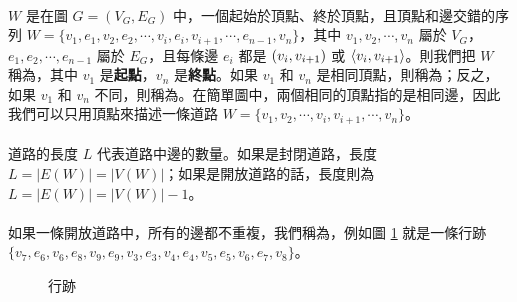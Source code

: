 \documentclass[12pt,a4paper,oneside]{report}
\begin{document}
\begin{CJK}{UTF8}{bkai}
\paragraph{}$W$ 是在圖 $G=(V_G,E_G)$ 中，一個起始於頂點、終於頂點，且頂點和邊交錯的序列 $W=\{{v_1,e_1,v_2,e_2,\cdots{}, v_i,e_i,v_{i+1},\cdots{},e_{n-1},v_n}\}$，其中 $v_1,v_2,\cdots{},v_n$ 屬於 $V_G$，$e_1,e_2,\cdots{},e_{n-1}$ 屬於 $E_G$，且每條邊 $e_i$ 都是 $({v_i},{v_{i+1}})$ 或 $\langle{}{{v_i},{v_{i+1}}}\rangle{}$。則我們把 $W$ 稱為\textbf{}，其中 $v_1$ 是\textbf{起點}，$v_n$ 是\textbf{終點}。如果 $v_1$ 和 $v_n$ 是相同頂點，則稱為；反之，如果 $v_1$ 和 $v_n$ 不同，則稱為。在簡單圖中，兩個相同的頂點指的是相同邊，因此我們可以只用頂點來描述一條道路 $W=\{{v_1,v_2,\cdots{},v_i,v_{i+1},\cdots{},v_n}\}$。
\paragraph{}道路的長度 $L$ 代表道路中邊的數量。如果是封閉道路，長度 $L=|E(W)|=|V(W)|$；如果是開放道路的話，長度則為 $L=|E(W)|=|V(W)|-1$。
\paragraph{}如果一條開放道路中，所有的邊都不重複，我們稱為\textbf{}，例如圖 \ref{fig:graph_walk} 就是一條行跡 $\{{v_7,e_6,v_6,e_8,v_9,e_9,v_3,e_3,v_4,e_4,v_5,e_5,v_6,e_7,v_8}\}$。
\begin{figure}[h!]
\centering
{}
\caption{行跡}
\label{fig:graph_walk}
\end{figure}


\end{CJK}
\end{document}
